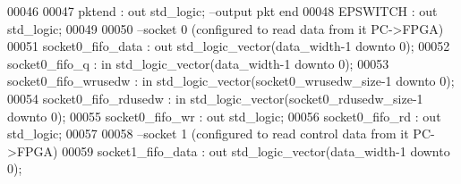 \begin{DoxyCode}
00046 
00047         \textcolor{vhdlchar}{pktend}              \textcolor{vhdlchar}{:} \textcolor{keywordflow}{out} \textcolor{comment}{std\_logic};\textcolor{keyword}{                                    --output pkt end }
00048         \textcolor{vhdlchar}{EPSWITCH}                    \textcolor{vhdlchar}{:} \textcolor{keywordflow}{out} \textcolor{comment}{std\_logic};
00049         
00050 \textcolor{keyword}{        --socket 0 (configured to read data from it PC->FPGA)}
00051         \textcolor{vhdlchar}{socket0_fifo_data}           \textcolor{vhdlchar}{:} \textcolor{keywordflow}{out} \textcolor{comment}{std\_logic\_vector}\textcolor{vhdlchar}{(}\textcolor{vhdlchar}{data_width}\textcolor{vhdlchar}{-}\textcolor{vhdllogic}{}\textcolor{vhdllogic}{1} \textcolor{keywordflow}{downto} \textcolor{vhdllogic}{}\textcolor{vhdllogic}{0}\textcolor{vhdlchar}{)};
00052         \textcolor{vhdlchar}{socket0_fifo_q}              \textcolor{vhdlchar}{:} \textcolor{keywordflow}{in} \textcolor{comment}{std\_logic\_vector}\textcolor{vhdlchar}{(}\textcolor{vhdlchar}{data_width}\textcolor{vhdlchar}{-}\textcolor{vhdllogic}{}\textcolor{vhdllogic}{1} \textcolor{keywordflow}{downto} \textcolor{vhdllogic}{}\textcolor{vhdllogic}{0}\textcolor{vhdlchar}{)};
00053         \textcolor{vhdlchar}{socket0_fifo_wrusedw}        \textcolor{vhdlchar}{:} \textcolor{keywordflow}{in} \textcolor{comment}{std\_logic\_vector}\textcolor{vhdlchar}{(}\textcolor{vhdlchar}{socket0_wrusedw_size}\textcolor{vhdlchar}{-}\textcolor{vhdllogic}{}\textcolor{vhdllogic}{1} \textcolor{keywordflow}{downto} \textcolor{vhdllogic}{}\textcolor{vhdllogic}{0}\textcolor{vhdlchar}{)};
00054         \textcolor{vhdlchar}{socket0_fifo_rdusedw}        \textcolor{vhdlchar}{:} \textcolor{keywordflow}{in} \textcolor{comment}{std\_logic\_vector}\textcolor{vhdlchar}{(}\textcolor{vhdlchar}{socket0_rdusedw_size}\textcolor{vhdlchar}{-}\textcolor{vhdllogic}{}\textcolor{vhdllogic}{1} \textcolor{keywordflow}{downto} \textcolor{vhdllogic}{}\textcolor{vhdllogic}{0}\textcolor{vhdlchar}{)};
00055         \textcolor{vhdlchar}{socket0_fifo_wr}         \textcolor{vhdlchar}{:} \textcolor{keywordflow}{out} \textcolor{comment}{std\_logic};
00056         \textcolor{vhdlchar}{socket0_fifo_rd}         \textcolor{vhdlchar}{:} \textcolor{keywordflow}{out} \textcolor{comment}{std\_logic};
00057 
00058 \textcolor{keyword}{        --socket 1 (configured to read control data from it PC->FPGA)}
00059         \textcolor{vhdlchar}{socket1_fifo_data}           \textcolor{vhdlchar}{:} \textcolor{keywordflow}{out} \textcolor{comment}{std\_logic\_vector}\textcolor{vhdlchar}{(}\textcolor{vhdlchar}{data_width}\textcolor{vhdlchar}{-}\textcolor{vhdllogic}{}\textcolor{vhdllogic}{1} \textcolor{keywordflow}{downto} \textcolor{vhdllogic}{}\textcolor{vhdllogic}{0}\textcolor{vhdlchar}{)};

\end{DoxyCode}
